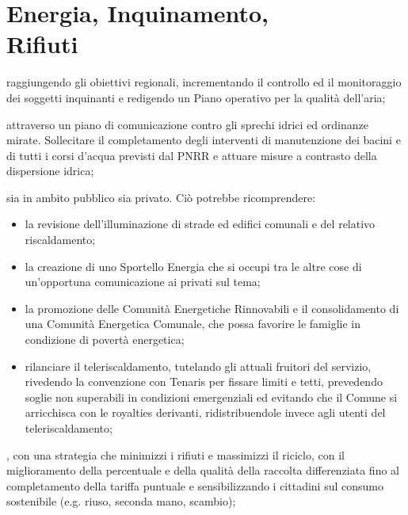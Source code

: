 \section[Energia, Inquinamento, Rifiuti]{Energia, Inquinamento,\\Rifiuti}
 raggiungendo gli obiettivi regionali, incrementando il controllo ed il monitoraggio dei soggetti inquinanti e redigendo un Piano operativo per la qualità dell'aria; 

 attraverso un piano di comunicazione contro gli sprechi idrici ed ordinanze mirate. Sollecitare il completamento degli interventi di manutenzione dei bacini e di tutti i corsi d'acqua previsti dal PNRR e attuare misure a contrasto della dispersione idrica;

\begin{bluebox}
 sia in ambito pubblico sia privato. Ciò potrebbe ricomprendere:
\begin{itemize}
  \item la revisione dell'illuminazione di strade ed edifici comunali e del relativo riscaldamento;
  \item la creazione di uno Sportello Energia che si occupi tra le altre cose di un'opportuna comunicazione ai privati sul tema; 
  \item la promozione delle Comunità Energetiche Rinnovabili e il consolidamento di una Comunità Energetica Comunale, che possa favorire le famiglie in condizione di povertà energetica;  
  \item rilanciare il teleriscaldamento, tutelando gli attuali fruitori del servizio, rivedendo la convenzione con Tenaris per fissare limiti e tetti, prevedendo soglie non superabili in condizioni emergenziali ed evitando che il Comune si arricchisca con le royalties derivanti, ridistribuendole invece agli utenti del teleriscaldamento; 
\end{itemize} 
\end{bluebox}

, con una strategia che minimizzi i rifiuti e massimizzi il riciclo, con il miglioramento della percentuale e della qualità della raccolta differenziata fino al completamento della tariffa puntuale e sensibilizzando i cittadini sul consumo sostenibile (e.g. riuso, seconda mano, scambio);

